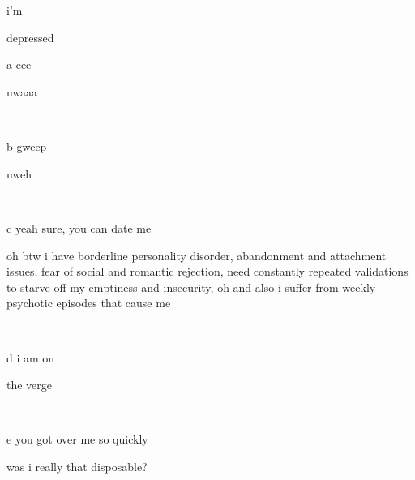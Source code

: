 \documentclass{article}
\begin{document}
\section{}

\begin{problem*}
i'm
\end{problem*}

depressed

\begin{problem} a
eee
\end{problem}

uwaaa

\

\begin{problem} b
gweep
\end{problem}

uweh

\

\begin{problem} c
yeah sure, you can date me
\end{problem}

oh btw i have borderline personality disorder, abandonment and attachment issues, fear of social and romantic rejection, need constantly repeated validations to starve off my emptiness and insecurity, oh and also i suffer from weekly psychotic episodes that cause me

\

\begin{problem} d
i am on
\end{problem}

the verge

\

\begin{problem} e
you got over me so quickly
\end{problem}

was i really that disposable?

\
\hline
\end{document}
